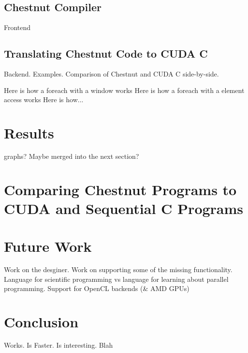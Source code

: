 \subsection{Chestnut Compiler}

Frontend

\subsection{Translating Chestnut Code to CUDA C}

Backend. Examples. Comparison of Chestnut and CUDA C side-by-side.

Here is how a foreach with a window works
Here is how a foreach with a element access works
Here is how...

   

\section{Results}

graphs? Maybe merged into the next section?




\section{Comparing Chestnut Programs to CUDA and Sequential C Programs}



\section{Future Work}

Work on the desginer. Work on supporting some of the missing functionality.
Language for scientific programming vs language for learning about parallel
programming. Support for OpenCL backends (\& AMD GPUs)



\section{Conclusion}

Works. Is Faster. Is interesting. Blah
